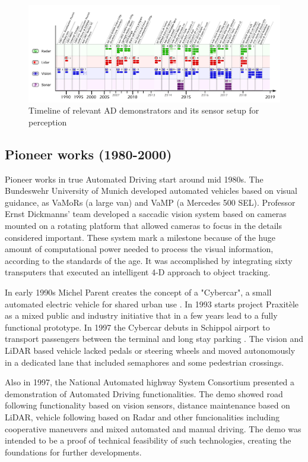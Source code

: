 \begin{figure}[p] %
  \centering
  \includegraphics[width=0.95\textheight,angle=90,keepaspectratio]{"img/AD_Timeline_2"}
  \caption{Timeline of relevant AD demonstrators and its sensor setup for 
      perception}
  \label{fig:tech-demos}
\end{figure}

\subsection{Pioneer works (1980-2000)}

Pioneer works in true Automated Driving start around mid 1980s. The
Bundeswehr University of Munich developed automated vehicles based on visual 
guidance, as VaMoRs \cite{Dickmanns1987} (a large van) and VaMP 
\cite{Gregor2002} (a Mercedes 500 SEL). Professor Ernst Dickmanns' team 
developed a saccadic vision system based on cameras mounted on a rotating 
platform that allowed cameras to focus in the details considered important.
These system mark a milestone because of the huge amount of computational power 
needed to process the visual information, according to the standards of the 
age. It was accomplished by integrating sixty transputers that executed an
intelligent 4-D approach to object tracking.

In early 1990s Michel Parent creates the concept of a "Cybercar", a small 
automated electric vehicle for shared urban use \cite{Parent1993}. In 1993 
starts project Praxitèle \cite{Massot1999} as a mixed public and industry
initiative that in a few years lead to a fully functional prototype. 
In 1997 the Cybercar debuts in Schippol airport to transport passengers between 
the terminal and long stay parking \cite{Ozguner2007}. 
The vision and LiDAR based vehicle lacked pedals or steering wheels and moved
autonomously in a dedicated lane that included semaphores and some pedestrian 
crossings.

Also in 1997, the National Automated highway System Consortium presented a 
demonstration of Automated Driving functionalities\cite{Thorpe1997}. 
The demo showed road following functionality based on vision sensors, 
distance maintenance based on LiDAR, vehicle following based on Radar
and other funcionalities including cooperative maneuvers and mixed automated 
and manual driving. 
The demo was intended to be a proof of technical feasibility of such 
technologies, creating the foundations for further developments.

